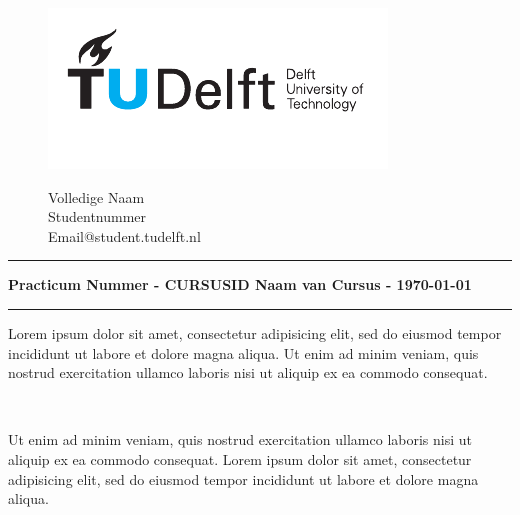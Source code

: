 \documentclass[a4paper, answers, addpoints]{exam}
\begin{document}
\begin{figure}[ht!]
    \begin{minipage}[H]{0.33\textwidth}
		\vspace{0.3cm}
		\includegraphics[scale=0.8]{TUDelftLogo.pdf}
	\end{minipage}
	\begin{minipage}[H]{0.33\textwidth}
    \hfill
	\end{minipage}
	\begin{minipage}[H]{0.33\textwidth}
		\begin{center}
		\large{Volledige Naam}\\
		\normalsize
			Studentnummer\\
			Email@student.tudelft.nl
		\end{center}
	\end{minipage}
\end{figure}
\vspace{-0.5cm}
\hrule
\begin{center}
	\textbf{Practicum Nummer - CURSUSID Naam van Cursus  - \today}\\
\end{center}
\hrule
\vspace{0.3cm}
    
    \begin{questions}
        \question[2] Lorem ipsum dolor sit amet, consectetur adipisicing elit, sed do eiusmod tempor incididunt ut labore et dolore magna aliqua. Ut enim ad minim veniam, quis nostrud exercitation ullamco laboris nisi ut aliquip ex ea commodo consequat.
        \begin{solution}\\
            \blindmathpaper@english
        \end{solution}
        \question[2] Ut enim ad minim veniam, quis nostrud exercitation ullamco laboris nisi ut aliquip ex ea commodo consequat. Lorem ipsum dolor sit amet, consectetur adipisicing elit, sed do eiusmod tempor incididunt ut labore et dolore magna aliqua.
        \begin{solution}\\
            \blindmathpaper@english
        \end{solution}
    \end{questions}
\end{document}

